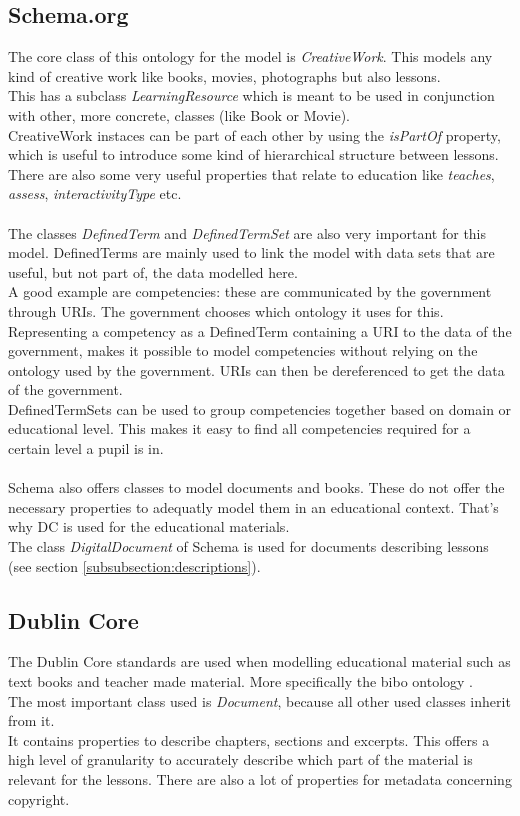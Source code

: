 \documentclass[a4paper]{report}
\begin{document}
    \subsection{Schema.org}
    The core class of this ontology for the model is \textit{CreativeWork}. This models any kind of creative work like books, movies, photographs but also lessons.\\
    This has a subclass \textit{LearningResource} which is meant to be used in conjunction with other, more concrete, classes (like Book or Movie).\\
    CreativeWork instaces can be part of each other by using the \textit{isPartOf} property, which is useful to introduce some kind of hierarchical structure between lessons.\\
    There are also some very useful properties that relate to education like \textit{teaches}, \textit{assess}, \textit{interactivityType} etc.\\ \\
    The classes \textit{DefinedTerm} and \textit{DefinedTermSet} are also very important for this model. DefinedTerms are mainly used to link the model with data sets that are useful, but not part of, the data modelled here.\\
    A good example are competencies: these are communicated by the government through URIs. The government chooses which ontology it uses for this.
    Representing a competency as a DefinedTerm containing a URI to the data of the government, makes it possible to model competencies without relying on the ontology used by the government. URIs can then be dereferenced to get the data of the government.\\
    DefinedTermSets can be used to group competencies together based on domain or educational level. This makes it easy to find all competencies required for a certain level a pupil is in.\\ \\
    Schema also offers classes to model documents and books. These do not offer the necessary properties to adequatly model them in an educational context. That's why DC is used for the educational materials.\\
    The class \textit{DigitalDocument} of Schema is used for documents describing lessons (see section \ref{subsubsection:descriptions}).

    \subsection{Dublin Core}
    The Dublin Core standards are used when modelling educational material such as text books and teacher made material. More specifically the bibo ontology \cite{bibo}.\\
    The most important class used is \textit{Document}, because all other used classes inherit from it.\\
    It contains properties to describe chapters, sections and excerpts. This offers a high level of granularity to accurately describe which part of the material is relevant for the lessons.
    There are also a lot of properties for metadata concerning copyright.
\end{document}
